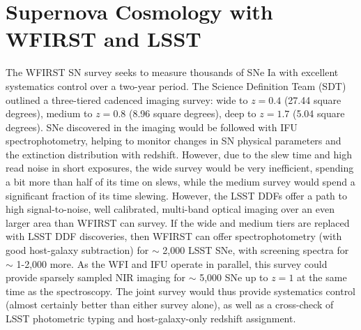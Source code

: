 %
%

\section{Supernova Cosmology with WFIRST and LSST}
\def\secname{\chpname:supernovae}\label{sec:\secname}


%

The WFIRST SN survey seeks to measure thousands of SNe Ia with excellent systematics control over a two-year period. The Science Definition Team (SDT) outlined a three-tiered cadenced imaging survey: wide to $z=0.4$ (27.44 square degrees), medium to $z=0.8$ (8.96 square degrees), deep to $z=1.7$ (5.04 square degrees). SNe discovered in the imaging would be followed with IFU spectrophotometry, helping to monitor changes in SN physical parameters and the extinction distribution with redshift. However, due to the slew time and high read noise in short exposures, the wide survey would be very inefficient, spending a bit more than half of its time on slews, while the medium survey would spend a significant fraction of its time slewing. However, the LSST DDFs offer a path to high signal-to-noise, well calibrated, multi-band optical imaging over an even larger area than WFIRST can survey. If the wide and medium tiers are replaced with LSST DDF discoveries, then WFIRST can offer spectrophotometry (with good host-galaxy subtraction) for $\sim$ 2,000 LSST SNe, with screening spectra for $\sim$ 1-2,000 more. As the WFI and IFU operate in parallel, this survey could provide sparsely sampled NIR imaging for $\sim$ 5,000 SNe up to $z = 1$ at the same time as the spectroscopy. The joint survey would thus provide systematics control (almost certainly better than either survey alone), as well as a cross-check of LSST photometric typing and host-galaxy-only redshift assignment.


